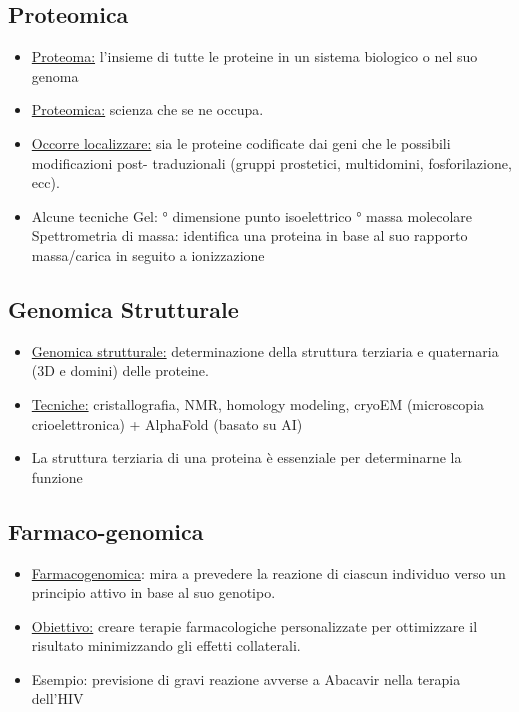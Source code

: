 \documentclass{article}
\begin{document}
\subsection{Proteomica}
\begin{itemize}
    \item \underline{Proteoma:} l'insieme di tutte le
    proteine in un sistema biologico o
    nel suo genoma
    \item \underline{Proteomica:} scienza che se ne
    occupa.
    \item \underline{Occorre localizzare:} sia le
    proteine codificate dai geni che le
    possibili modificazioni post-
    traduzionali (gruppi prostetici,
    multidomini, fosforilazione, ecc).
    \item Alcune tecniche
    \subitem{-} Gel:
        ° dimensione punto
        isoelettrico
        ° massa molecolare
    \subitem{-} Spettrometria di massa:
    identifica una proteina in base
    al suo rapporto massa/carica in
    seguito a ionizzazione
\end{itemize}
\subsection{Genomica Strutturale}
\begin{itemize}
    \item \underline{Genomica strutturale:}
    determinazione della struttura
    terziaria e quaternaria (3D e
    domini) delle proteine.
    \item \underline{Tecniche:} cristallografia, NMR,
    homology modeling, cryoEM
    (microscopia crioelettronica)
    + AlphaFold (basato su AI)
    \item La struttura terziaria di una
    proteina è essenziale per
    determinarne la funzione
\end{itemize}
\subsection{Farmaco-genomica}
\begin{itemize}
    \item \underline{Farmacogenomica}: mira a
    prevedere la reazione di ciascun
    individuo verso un principio attivo
    in base al suo genotipo.
    \item \underline{Obiettivo:} creare terapie
    farmacologiche personalizzate
    per ottimizzare il risultato
    minimizzando gli effetti
    collaterali.
    \item Esempio: previsione di gravi
    reazione avverse a Abacavir
    nella terapia dell'HIV
\end{itemize}
\end{document}
